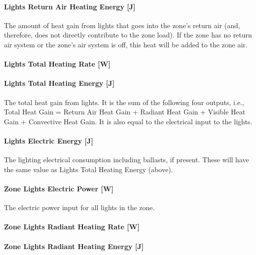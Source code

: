 \paragraph{Lights Return Air Heating Energy {[}J{]}}\label{lights-return-air-heating-energy-j}

The amount of heat gain from lights that goes into the zone's return air (and, therefore, does not directly contribute to the zone load). If the zone has no return air system or the zone's air system is off, this heat will be added to the zone air.

\paragraph{Lights Total Heating Rate {[}W{]}}\label{lights-total-heating-rate-w}

\paragraph{Lights Total Heating Energy {[}J{]}}\label{lights-total-heating-energy-j}

The total heat gain from lights. It is the sum of the following four outputs, i.e., Total Heat Gain = Return Air Heat Gain + Radiant Heat Gain + Visible Heat Gain + Convective Heat Gain. It is also equal to the electrical input to the lights.

\paragraph{Lights Electric Energy {[}J{]}}\label{lights-electric-energy-j}

The lighting electrical consumption including ballasts, if present. These will have the same value as Lights Total Heating Energy (above).

\paragraph{Zone Lights Electric Power {[}W{]}}\label{zone-lights-electric-power-w}

The electric power input for all lights in the zone.

\paragraph{Zone Lights Radiant Heating Rate {[}W{]}}\label{zone-lights-radiant-heating-rate-w}

\paragraph{Zone Lights Radiant Heating Energy {[}J{]}}\label{zone-lights-radiant-heating-energy-j}

